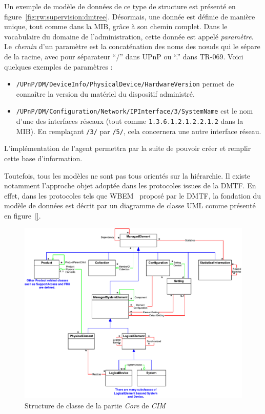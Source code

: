 Un exemple de modèle de données de ce type de structure est présenté en figure~\ref{fig:rw:supervision:dmtree}. Désormais, une donnée est définie de manière unique, tout comme dans la MIB, grâce à son chemin complet. Dans le vocabulaire du domaine de l'administration, cette donnée est appelé \textit{paramètre}. Le \textit{chemin} d'un paramètre est la concaténation des noms des nœuds qui le sépare de la racine, avec pour séparateur \enquote{/} dans UPnP ou \enquote{.} dans TR-069. Voici quelques exemples de paramètres :
\begin{itemize}
\item \verb|/UPnP/DM/DeviceInfo/PhysicalDevice/HardwareVersion| permet de connaître la version du matériel du dispositif administré. 
\item \verb|/UPnP/DM/Configuration/Network/IPInterface/3/SystemName| est le nom d'une des interfaces réseaux (tout comme \verb|1.3.6.1.2.1.2.2.1.2| dans la MIB). En remplaçant \verb|/3/| par \verb|/5/|, cela concernera une autre interface réseau.
\end{itemize}

L'implémentation de l'agent permettra par la suite de pouvoir créer et remplir cette base d'information.

Toutefois, tous les modèles ne sont pas tous orientés sur la hiérarchie. Il existe notamment l'approche objet adoptée dans les protocoles issues de la DMTF. En effet, dans les protocoles tels que WBEM~\cite{DMTF:WBEM} proposé par le DMTF, la fondation du modèle de données est décrit par un diagramme de classe UML comme présenté en figure~\ref{}.
\begin{figure}[ht]
    \centering
    \includegraphics[width=.75\textwidth]{fig/rw-supervision-cimcore}
    \caption{Structure de classe de la partie \textit{Core} de \textit{CIM}}\label{fig:rw:supervision:cimcore}
\end{figure}
